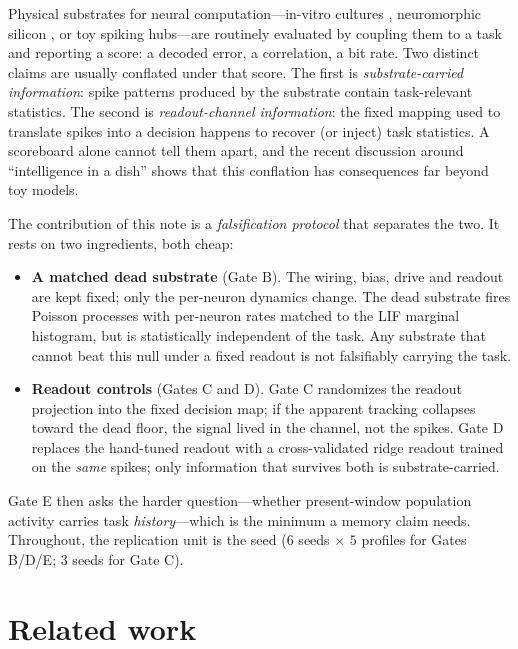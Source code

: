 \documentclass[10pt,a4paper]{article}
\begin{document}
Physical substrates for neural computation---in-vitro cultures
\cite{kagan2022dishbrain}, neuromorphic silicon \cite{maass1997,
lukosevicius2009}, or toy spiking hubs---are routinely evaluated by
coupling them to a task and reporting a score: a decoded error, a
correlation, a bit rate. Two distinct claims are usually conflated
under that score. The first is \emph{substrate-carried information}:
spike patterns produced by the substrate contain task-relevant
statistics. The second is \emph{readout-channel information}: the
fixed mapping used to translate spikes into a decision happens to
recover (or inject) task statistics. A scoreboard alone cannot tell
them apart, and the recent discussion around ``intelligence in a
dish'' \cite{kagan2022dishbrain,balci2023neurons,kagan2023semantics}
shows that this conflation has consequences far beyond toy models.

The contribution of this note is a \emph{falsification protocol} that
separates the two. It rests on two ingredients, both cheap:

\begin{itemize}[nosep]
\item \textbf{A matched dead substrate} (Gate B). The wiring, bias,
drive and readout are kept fixed; only the per-neuron dynamics change.
The dead substrate fires Poisson processes with per-neuron rates
matched to the LIF marginal histogram, but is statistically independent
of the task. Any substrate that cannot beat this null under a fixed
readout is not falsifiably carrying the task.
\item \textbf{Readout controls} (Gates C and D). Gate C randomizes the
readout projection into the fixed decision map; if the apparent tracking
collapses toward the dead floor, the signal lived in the channel, not
the spikes. Gate D replaces the hand-tuned readout with a
cross-validated ridge readout trained on the \emph{same} spikes; only
information that survives both is substrate-carried.
\end{itemize}

Gate E then asks the harder question---whether present-window population
activity carries task \emph{history}---which is the minimum a memory
claim needs. Throughout, the replication unit is the seed
($6$ seeds $\times$ $5$ profiles for Gates B/D/E; $3$ seeds for Gate C).

\section{Related work}\label{sec:related}
\end{document}
